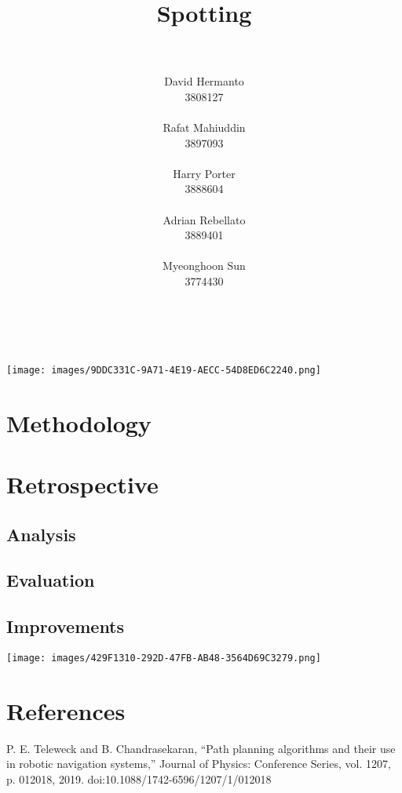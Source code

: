 \documentclass[10pt,english]{article}
\title{\huge{\textbf{Spotting}}}
\author{
    \\\\
    David Hermanto\\
    \small 3808127\\
    \\
    Rafat Mahiuddin\\
    \small 3897093\\
    \\
    Harry Porter\\
    \small 3888604\\
    \\
    Adrian Rebellato\\
    \small 3889401\\
    \\
    Myeonghoon Sun\\
    \small 3774430\\
    \\\\
}
\date{}
\begin{document}
\maketitle
\thispagestyle{empty}
\clearpage

\vspace*{\fill}
\begin{center}
\texttt{[image: images/9DDC331C-9A71-4E19-AECC-54D8ED6C2240.png]}
\end{center}
\vfill
\thispagestyle{empty}

\clearpage


\section*{Methodology}
\clearpage

\section*{Retrospective}
\clearpage

\subsection*{Analysis}
\clearpage

\subsection*{Evaluation}
\clearpage

\subsection*{Improvements}
\clearpage

\vspace*{\fill}
\begin{center}
\texttt{[image: images/429F1310-292D-47FB-AB48-3564D69C3279.png]}
\end{center}
\vfill
\thispagestyle{empty}
\clearpage

\section*{References}

\begin{enumerate}[leftmargin=*,label={\texttt{[\arabic*]}},noitemsep]
    \item P. E. Teleweck and B. Chandrasekaran, “Path planning algorithms and their use in robotic navigation systems,” Journal of Physics: Conference Series, vol. 1207, p. 012018, 2019. doi:10.1088/1742-6596/1207/1/012018
\end{enumerate}
\end{document}
